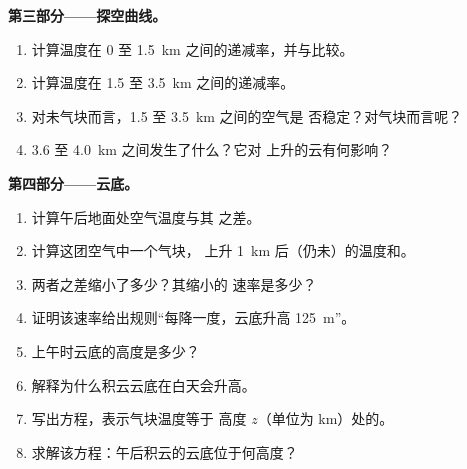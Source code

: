 \begin{problem}
\medskip
\noindent\textbf{第三部分——探空曲线。}
\begin{enumerate}[resume]
  \item 计算温度在 \num{0} 至 \qty{1.5}{km}
        之间的递减率，并与比较。
  \item 计算温度在 \num{1.5} 至 \qty{3.5}{km} 之间的递减率。
  \item 对未气块而言，\num{1.5} 至 \qty{3.5}{km} 之间的空气是
        否稳定？对气块而言呢？
  \item \num{3.6} 至 \qty{4.0}{km} 之间发生了什么？它对
        上升的云有何影响？
\end{enumerate}

\medskip
\noindent\textbf{第四部分——云底。}
\begin{enumerate}[resume]
  \item 计算午后地面处空气温度与其
        之差。
  \item 计算这团空气中一个气块，
        上升 \qty{1}{km} 后（仍未）的温度和。
  \item 两者之差缩小了多少？其缩小的
        速率是多少？
  \item 证明该速率给出规则“每降一度，云底升高 \qty{125}{m}”。
  \item 上午时云底的高度是多少？
  \item 解释为什么积云云底在白天会升高。
  \item 写出方程，表示气块温度等于
        高度 $z$（单位为 km）处的。
  \item 求解该方程：午后积云的云底位于何高度？
\end{enumerate}
\end{problem}
